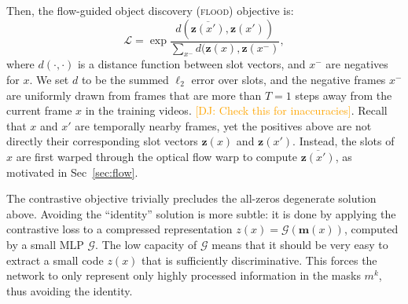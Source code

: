 \documentclass{article}
\newcommand{\jd}[1]{\textcolor{orange}{[DJ: #1]}}
\begin{document}
Then, the flow-guided object discovery (\textsc{flood}) objective is:
\begin{equation}
\mathcal{L} = \exp \dfrac {d(\overline{\bm{z}(x')}, \bm{z}(x'))}{\sum_{x^-} d(\bm{z}(x), \bm{z}(x^-)}, \label{eq:flood_loss}
\end{equation}
where $d(\cdot, \cdot)$ is a distance function between slot vectors, and $x^-$ are negatives for $x$. We set $d$ to be the summed $\ell_2$ error over slots, and the negative frames $x^-$ are uniformly drawn from frames that are more than $T=1$ steps away from the current frame $x$ in the training videos. \jd{Check this for inaccuracies}. Recall that $x$ and $x'$ are temporally nearby frames, yet the positives above are not directly their corresponding slot vectors $\bm{z}(x)$ and $\bm{z}(x')$. Instead, the slots of $x$ are first warped through the optical flow warp to compute $\overline{\bm{z}(x')}$, as motivated in Sec~\ref{sec:flow}.

The contrastive objective trivially precludes the all-zeros degenerate solution above. Avoiding the ``identity'' solution is more subtle: it is done by applying the contrastive loss to a compressed representation $z(x)=\mathcal{G}(\bm{m}(x))$, computed by a small MLP $\mathcal{G}$. The low capacity of $\mathcal{G}$ means that it should be very easy to extract a small code $z(x)$ that is sufficiently discriminative. This forces the network to only represent only highly processed information in the masks $m^k$, thus avoiding the identity. 




\end{document}

